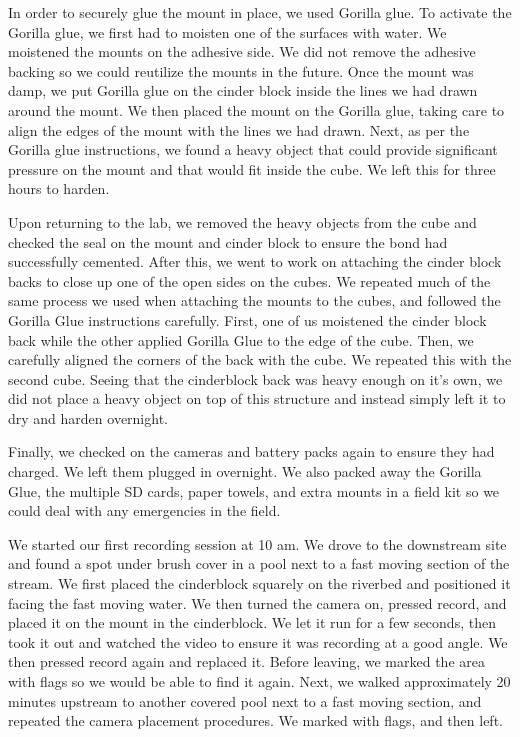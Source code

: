 \documentclass{article}\usepackage[]{graphicx}\usepackage[]{color}
\begin{document}
In order to securely glue the mount in place, we used Gorilla glue. To activate the Gorilla glue, we first had to moisten one of the surfaces with water. We moistened the mounts on the adhesive side. We did not remove the adhesive backing so we could reutilize the mounts in the future. Once the mount was damp, we put Gorilla glue on the cinder block inside the lines we had drawn around the mount. We then placed the mount on the Gorilla glue, taking care to align the edges of the mount with the lines we had drawn. Next, as per the Gorilla glue instructions, we found a heavy object that could provide significant pressure on the mount and that would fit inside the cube. We left this for three hours to harden.

Upon returning to the lab, we removed the heavy objects from the cube and checked the seal on the mount and cinder block to ensure the bond had successfully cemented. After this, we went to work on attaching the cinder block backs to close up one of the open sides on the cubes. We repeated much of the same process we used when attaching the mounts to the cubes, and followed the Gorilla Glue instructions carefully. First, one of us moistened the cinder block back while the other applied Gorilla Glue to the edge of the cube. Then, we carefully aligned the corners of the back with the cube. We repeated this with the second cube. Seeing that the cinderblock back was heavy enough on it's own, we did not place a heavy object on top of this structure and instead simply left it to dry and harden overnight.

Finally, we checked on the cameras and battery packs again to ensure they had charged. We left them plugged in overnight. We also packed away the Gorilla Glue, the multiple SD cards, paper towels, and extra mounts in a field kit so we could deal with any emergencies in the field.

We started our first recording session at 10 am.  We drove to the downstream site and found a spot under brush cover in a pool next to a fast moving section of the stream.  We first placed the cinderblock squarely on the riverbed and positioned it facing the fast moving water.  We then turned the camera on, pressed record, and placed it on the mount in the cinderblock.  We let it run for a few seconds, then took it out and watched the video to ensure it was recording at a good angle.  We then pressed record again and replaced it.  Before leaving, we marked the area with flags so we would be able to find it again.
Next, we walked approximately 20 minutes upstream to another covered pool next to a fast moving section, and repeated the camera placement procedures.  We marked with flags, and then left.
\end{document}
